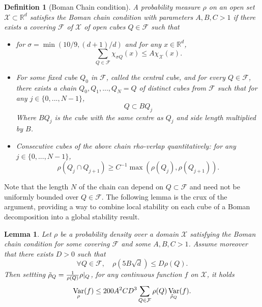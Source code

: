 \documentclass[11pt, oneside, titlepage]{book}
\theoremstyle{plain}
\newtheorem{lemma}[theorem]{Lemma}
\newtheorem{definition}[theorem]{Definition}
\theoremstyle{definition}
\newcommand{\R}{\mathbb{R}}
\newcommand{\X}{\mathcal{X}}
\newcommand{\F}{\mathcal{F}}
\DeclareMathOperator{\var}{Var}
\begin{document}
\begin{definition}[Boman Chain condition]\cite{boman1982lp}
A probability measure $\rho$ on an open set $\X \subset \R^d$ satisfies the Boman chain condition with parameters $A, B, C > 1$ if there exists a covering $\F$ of $\X$ of open cubes $Q \in \F$ such that
\begin{itemize}
    \item for $\sigma = \min(10/9, (d+1)/d)$ and for any $x \in \R^d$,
    \begin{equation}
        \label{eq: uniform upper bound on bowman cube overlap}
        \sum_{Q \in \F} \chi_{\sigma Q}(x) \leq A \chi_{\X}(x).
    \end{equation}
    \item For some fixed cube $Q_0$ in $\F$, called the central cube, and for every $Q \in \F$, there exists a chain $Q_0, Q_1,..., Q_N= Q$ of distinct cubes from $\F$ such that for any $j \in \{0,...,N-1\}$,
    \begin{equation}
        Q \subset B Q_j
    \end{equation}
    Where $BQ_j$ is the cube with the same centre as $Q_j$ and side length multiplied by $B$.
    \item Consecutive cubes of the above chain rho-verlap quantitatively: for any $j \in \{0,...,N-1\}$,
    \begin{equation}
        \rho(Q_j \cap Q_{j+1}) \geq C^{-1} \max(\rho(Q_j), \rho(Q_{j+1})).
    \end{equation}
\end{itemize} 
\end{definition}
Note that the length $N$ of the chain can depend on $Q \subset \F$ and need not be uniformly bounded over $Q \in \F$. The following lemma is the crux of the argument, providing a way to combine local stability on each cube of a Boman decomposition into a global stability result.
\begin{lemma}\textnormal{\cite[Lemma 3.3]{letrouit2024gluing}}
\label{lemma-gluingvars-letrouit}
Let $\rho$ be a probability density over a domain $\X$ satisfying the Boman chain condition for some covering $\mathcal{F}$ and some $A, B, C > 1$. Assume moreover that there exists $D >0$ such that
\begin{equation}
\label{scale regularity assumption}
    \forall Q \in \F, \quad \rho(5B\sqrt{d}) \leq D \rho(Q).
\end{equation}
Then settting $\Tilde\rho_Q = \frac{1}{\rho(Q)}\rho|_Q$, for any continuous function $f$ on $\X$, it holds
\begin{equation*}
    \var_\rho(f) \leq 200 A^2 C D^3 \sum_{Q \in \F} \rho(Q) \var_{\Tilde{\rho}_Q}(f).
\end{equation*}
\end{lemma}
\end{document}
